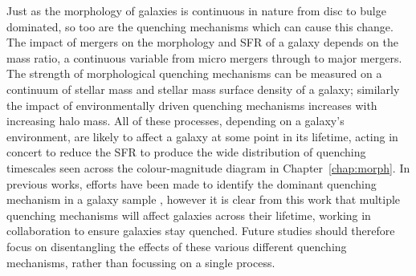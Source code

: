 Just as the morphology of galaxies is continuous in nature from disc to bulge dominated, so too are the quenching mechanisms which can cause this change. The impact of mergers on the morphology and SFR of a galaxy depends on the mass ratio, a continuous variable from micro mergers \citep{carlin16} through to major mergers. The strength of morphological quenching mechanisms can be measured on a continuum of stellar mass and stellar mass surface density of a galaxy; similarly the impact of environmentally driven quenching mechanisms increases with increasing halo mass. All of these processes, depending on a galaxy's environment, are likely to affect a galaxy at some point in its lifetime, acting in concert to reduce the SFR to produce the wide distribution of quenching timescales seen across the colour-magnitude diagram in Chapter~\ref{chap:morph}. In previous works, efforts have been made to identify the dominant quenching mechanism in a galaxy sample \citep[e.g.][]{schawinski14, balogh16, huertascompany16}, however it is clear from this work that multiple quenching mechanisms will affect galaxies across their lifetime, working in collaboration to ensure galaxies stay quenched. Future studies should therefore focus on disentangling the effects of these various different quenching mechanisms, rather than focussing on a single process. 


